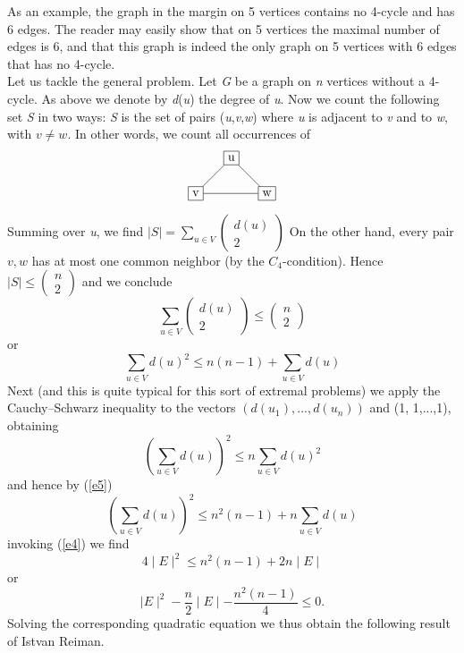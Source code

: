 \documentclass[10pt,twoside]{book}
\begin{document}
		As an example, the graph in the margin on 5 vertices contains no 4-cycle and has 6 edges. The reader may easily show that on 5 vertices the maximal number of edges is 6, and that this graph is indeed the only graph on 5 vertices with 6 edges that has no 4-cycle.\\
		Let us tackle the general problem. Let \textit{G} be a graph on \textit{n} vertices without a 4-cycle. As above we denote by \textit{d}(\textit{u}) the degree of \textit{u}. Now we count the following set \textit{S} in two ways: \textit{S} is the set of pairs (\textit{u},{\textit{v},\textit{w}}) where
		\textit{u} is adjacent to \textit{v} and to \textit{w}, with $v \neq w$. In other words, we count all occurrences of
		$$
		\begin{tikzpicture}
			\node[draw] (0) at (0, 1) {u};
			\node[draw] (1) at (-1, 0) {v};
			\node[draw] (2) at (1, 0) {w};
			\draw (0) to (1);
			\draw (1) to (2);
			\draw (2) to (0);
		\end{tikzpicture}
		$$
		Summing over \textit{u}, we ﬁnd $\mid S \mid = \sum_{u \in V}\begin{pmatrix} d(u) \\ 2 \end{pmatrix}$ On the other hand, every pair ${v, w}$ has at most one common neighbor (by the $C_4$-condition). Hence $\mid S\mid \leq \begin{pmatrix} n \\ 2 \end{pmatrix}$ and we conclude
		$$\sum\limits_{u \in V}\begin{pmatrix} d(u) \\ 2 \end{pmatrix} \leq \begin{pmatrix} n \\ 2 \end{pmatrix}$$
		or
		\begin{equation*}
			\sum\limits_{u \in V}d(u)^{2} \leq n(n - 1) + \sum\limits_{u \in V}d(u)
			\label{e5} \tag{5}
		\end{equation*}
		Next (and this is quite typical for this sort of extremal problems) we apply the Cauchy–Schwarz inequality to the vectors $(d(u_1),...,d(u_n))$ and (1, 1,...,1), obtaining
		$$
			\left(\sum\limits_{u \in V}d(u)\right)^2 \leq n\sum\limits_{u \in V}d(u)^2
		$$
		and hence by (\ref{e5})
		$$
		\left(\sum\limits_{u \in V}d(u)\right)^2 \leq n^2(n-1) + n\sum\limits_{u \in V}d(u)
		$$
		invoking (\ref{e4}) we find
		$$
		4\mid E\mid^2 \leq n^2(n - 1) + 2n\mid E\mid
		$$
		or
		$$
		\mid E\mid^2 - \frac{n}{2}\mid E\mid - \frac{n^2(n - 1)}{4} \leq 0.
		$$
		Solving the corresponding quadratic equation we thus obtain the following result of Istvan Reiman.
		
\end{document}
